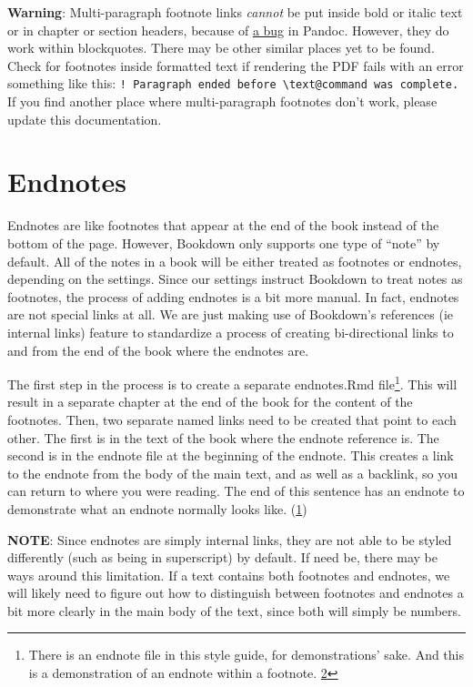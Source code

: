 \documentclass[
]{book}
\begin{document}
\textbf{Warning}: Multi-paragraph footnote links \emph{cannot} be put inside bold or italic text or in chapter or section headers, because of \href{https://github.com/jgm/pandoc/issues/6733}{a bug} in Pandoc. However, they do work within blockquotes. There may be other similar places yet to be found. Check for footnotes inside formatted text if rendering the PDF fails with an error something like this: \texttt{!\ Paragraph\ ended\ before\ \textbackslash{}text@command\ was\ complete.} If you find another place where multi-paragraph footnotes don't work, please update this documentation.

\hypertarget{endnotes}{%
\section{Endnotes}\label{endnotes}}

Endnotes are like footnotes that appear at the end of the book instead of the bottom of the page. However, Bookdown only supports one type of ``note'' by default. All of the notes in a book will be either treated as footnotes or endnotes, depending on the settings. Since our settings instruct Bookdown to treat notes as footnotes, the process of adding endnotes is a bit more manual. In fact, endnotes are not special links at all. We are just making use of Bookdown's references (ie internal links) feature to standardize a process of creating bi-directional links to and from the end of the book where the endnotes are.

The first step in the process is to create a separate endnotes.Rmd file\footnote{There is an endnote file in this style guide, for demonstrations' sake. And this is a demonstration of an endnote within a footnote. \protect\hypertarget{en.02.backlink}{\protect\hyperlink{en.02}{2}}}. This will result in a separate chapter at the end of the book for the content of the footnotes. Then, two separate named links need to be created that point to each other. The first is in the text of the book where the endnote reference is. The second is in the endnote file at the beginning of the endnote. This creates a link to the endnote from the body of the main text, and as well as a backlink, so you can return to where you were reading. The end of this sentence has an endnote to demonstrate what an endnote normally looks like. (\protect\hypertarget{en.01.backlink}{\protect\hyperlink{en.01}{1}})

\textbf{NOTE}: Since endnotes are simply internal links, they are not able to be styled differently (such as being in superscript) by default. If need be, there may be ways around this limitation. If a text contains both footnotes and endnotes, we will likely need to figure out how to distinguish between footnotes and endnotes a bit more clearly in the main body of the text, since both will simply be numbers.
\end{document}
